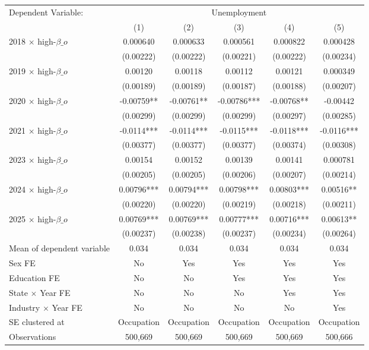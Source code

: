 \def\sym#1{\ifmmode^{#1}\else\(^{#1}\)\fi}
\begin{tabular}{l*{5}{c}}
\toprule
Dependent Variable: & \multicolumn{5}{c}{Unemployment} \\
\cmidrule(lr){2-6}
 & (1) & (2) & (3) & (4) & (5) \\
\midrule
2018 $\times$ high-$\beta\_o$&    0.000640   &    0.000633   &    0.000561   &    0.000822   &    0.000428   \\
            &   (0.00222)   &   (0.00222)   &   (0.00221)   &   (0.00222)   &   (0.00234)   \\
2019 $\times$ high-$\beta\_o$&     0.00120   &     0.00118   &     0.00112   &     0.00121   &    0.000349   \\
            &   (0.00189)   &   (0.00189)   &   (0.00187)   &   (0.00188)   &   (0.00207)   \\
2020 $\times$ high-$\beta\_o$&    -0.00759** &    -0.00761** &    -0.00786***&    -0.00768** &    -0.00442   \\
            &   (0.00299)   &   (0.00299)   &   (0.00299)   &   (0.00297)   &   (0.00285)   \\
2021 $\times$ high-$\beta\_o$&     -0.0114***&     -0.0114***&     -0.0115***&     -0.0118***&     -0.0116***\\
            &   (0.00377)   &   (0.00377)   &   (0.00377)   &   (0.00374)   &   (0.00308)   \\
2023 $\times$ high-$\beta\_o$&     0.00154   &     0.00152   &     0.00139   &     0.00141   &    0.000781   \\
            &   (0.00205)   &   (0.00205)   &   (0.00206)   &   (0.00207)   &   (0.00214)   \\
2024 $\times$ high-$\beta\_o$&     0.00796***&     0.00794***&     0.00798***&     0.00803***&     0.00516** \\
            &   (0.00220)   &   (0.00220)   &   (0.00219)   &   (0.00218)   &   (0.00211)   \\
2025 $\times$ high-$\beta\_o$&     0.00769***&     0.00769***&     0.00777***&     0.00716***&     0.00613** \\
            &   (0.00237)   &   (0.00238)   &   (0.00237)   &   (0.00234)   &   (0.00264)   \\
\midrule
Mean of dependent variable&       0.034   &       0.034   &       0.034   &       0.034   &       0.034   \\
Sex FE      &          No   &         Yes   &         Yes   &         Yes   &         Yes   \\
Education FE&          No   &          No   &         Yes   &         Yes   &         Yes   \\
State $\times$ Year FE&          No   &          No   &          No   &         Yes   &         Yes   \\
Industry $\times$ Year FE&          No   &          No   &          No   &          No   &         Yes   \\
SE clustered at&  Occupation   &  Occupation   &  Occupation   &  Occupation   &  Occupation   \\
Observations&     500,669   &     500,669   &     500,669   &     500,669   &     500,666   \\
\bottomrule
\end{tabular}
